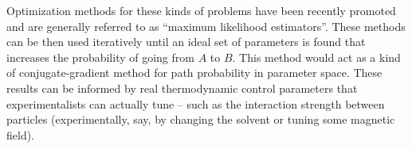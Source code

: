 \documentclass[11pt]{article}
\begin{document}
Optimization methods for these kinds of problems have been recently promoted and are generally referred to as ``maximum likelihood estimators''. %
These methods can be then used iteratively until an ideal set of parameters is found that increases the probability of going from $A$ to $B$.  This method would act as a kind of conjugate-gradient method for path probability in parameter space.  These results can be informed by real thermodynamic control parameters that experimentalists can actually tune -- such as the interaction strength between particles (experimentally, say, by changing the solvent or tuning some magnetic field).
\end{document}

